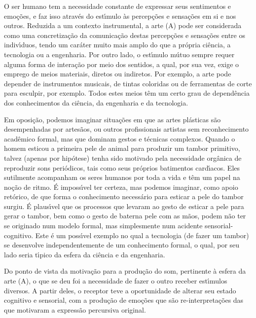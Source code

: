 \documentclass[
12pt,		%
openright,	%
twoside,  %
a4paper,			%
chapter=TITLE,		%
english,			%
french,				%
spanish,			%
brazil				%
]{USPSC-classe/USPSC}
\begin{document}
O ser humano tem a necessidade constante de expressar seus sentimentos e emo\c{c}\~oes, e faz isso atrav\'es do est\'{\i}mulo \`as percep\c{c}\~oes e sensa\c{c}\~oes em si e nos outros. Reduzida a um contexto instrumental, a arte (A) pode ser considerada como uma concretiza\c{c}\~ao da comunica\c{c}\~ao destas percep\c{c}\~oes e sensa\c{c}\~oes entre os indiv\'{\i}duos, tendo um car\'ater muito mais amplo do que a pr\'opria ci\^encia, a tecnologia ou a engenharia. Por outro lado, o est\'{\i}mulo m\'utuo sempre requer alguma forma de intera\c{c}\~ao por meio dos sentidos, a qual, por sua vez, exige o emprego de meios materiais, diretos ou indiretos. Por exemplo, a arte pode depender de instrumentos musicais, de tintas coloridas ou de ferramentas de corte para esculpir, por exemplo. Todos estes meios t\^em um certo grau de depend\^encia dos conhecimentos da ci\^encia, da engenharia e da tecnologia.









Em oposi\c{c}\~ao, podemos imaginar situa\c{c}\~oes em que as artes pl\'asticas s\~ao desempenhadas por artes\~aos, ou outros profissionais artistas sem reconhecimento acad\^emico formal, mas que dominam gestos e t\'ecnicas complexos. Quando o homem esticou a primeira pele de animal para produzir um tambor primitivo, talvez (apenas por hip\'otese) tenha sido motivado pela necessidade org\^anica de reproduzir sons peri\'odicos, tais como seus pr\'oprios batimentos card\'{\i}acos. Eles sutilmente acompanham os seres humanos por toda a vida e t\^em um papel na no\c{c}\~ao de ritmo. \'E imposs\'{\i}vel ter certeza, mas podemos imaginar, como apoio ret\'orico, de que forma o conhecimento necess\'ario para esticar a pele do tambor surgiu. \'E plaus\'{\i}vel que os processos que levaram ao gesto de esticar a pele para gerar o tambor, bem como o gesto de \textquotedbl bater\textquotedbl  na pele com as m\~aos, podem n\~ao ter se originado num modelo formal, mas simplesmente num acidente sensorial-cognitivo. Este \'e um poss\'{\i}vel exemplo no qual a tecnologia (de fazer um tambor) se desenvolve independentemente de um conhecimento formal, o qual, por seu lado seria t\'{\i}pico da esfera da ci\^encia e da engenharia.









Do ponto de vista da motiva\c{c}\~ao para a produ\c{c}\~ao do som, pertinente \`a esfera da arte (A), o que se deu foi a necessidade de fazer o outro receber est\'{\i}mulos diversos. A partir deles, o receptor teve a oportunidade de alterar seu estado cognitivo e sensorial, com a produ\c{c}\~ao de emo\c{c}\~oes que s\~ao re-interpreta\c{c}\~oes das que motivaram a express\~ao percursiva original.
\end{document}
